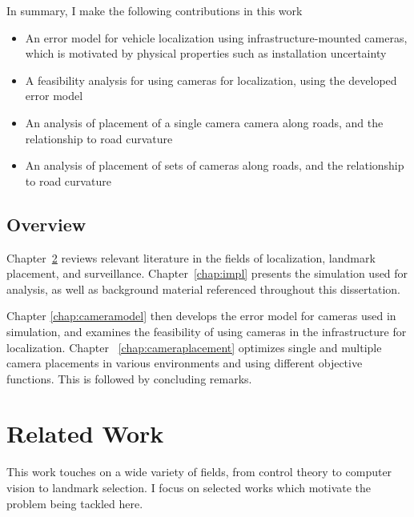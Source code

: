 \documentclass[a4paper,12pt,twoside,openright]{report}
\begin{document}
In summary, I make the following contributions in this work
\begin{itemize}
    \item An error model for vehicle localization using infrastructure-mounted cameras, which is motivated by physical properties such as installation uncertainty
    \item A feasibility analysis for using cameras for localization, using the developed error model
    \item An analysis of placement of a single camera camera along roads, and the relationship to road curvature
    \item An analysis of placement of sets of cameras along roads, and the relationship to road curvature
\end{itemize}



\section{Overview}

Chapter~\ref{chap:relatedwork} reviews relevant literature in the fields of
localization, landmark placement, and surveillance. Chapter~\ref{chap:impl} presents 
the simulation used for analysis, as well as background material referenced throughout 
this dissertation.

Chapter \ref{chap:cameramodel} then develops the error model for cameras
used in simulation, and examines the feasibility of using cameras in the infrastructure for localization.
Chapter ~\ref{chap:cameraplacement} optimizes single and multiple camera placements
in various environments and using different objective functions. This is followed by concluding remarks.

\chapter{Related Work} 
\label{chap:relatedwork}


This work touches on a wide variety of fields, from control
theory to computer vision to landmark selection. I focus
on selected works which motivate the problem being tackled here.
\end{document}

